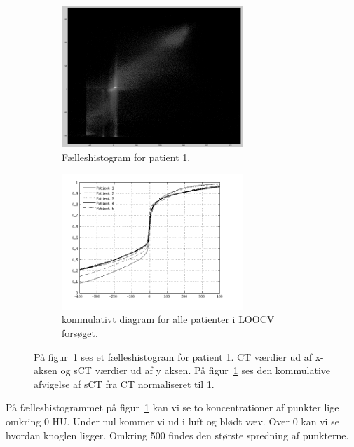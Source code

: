 \begin{figure}
    \centering
    \begin{subfigure}[b]{0.45\textwidth}
        \includegraphics[width=0.75\textwidth]{billeder/loocv_joint_histogram.png}
        \caption{Fælleshistogram for patient 1.}
        \label{fig:loocv_j_h}
    \end{subfigure}\hfill
    \begin{subfigure}[b]{0.45\textwidth}
        \includegraphics[width=0.75\textwidth]{billeder/cumm_diff_loocv.png}
        \caption{kommulativt diagram for alle patienter i LOOCV forsøget.}
        \label{fig:cumm_diff_loocv}
    \end{subfigure}
    \caption{På figur~\ref{fig:loocv_j_h} ses et fælleshistogram for patient 1. CT værdier ud af x-aksen og sCT værdier ud af y aksen. På figur~\ref{fig:loocv_j_h} ses den kommulative afvigelse af sCT fra CT normaliseret til 1.}
    \label{fig:loocv}
\end{figure}

På fælleshistogrammet på figur~\ref{fig:loocv_j_h} kan vi se to koncentrationer af punkter lige omkring 0 HU. Under nul kommer vi ud i luft og blødt væv. Over 0 kan vi se hvordan knoglen ligger. Omkring 500 findes den største spredning af punkterne.

